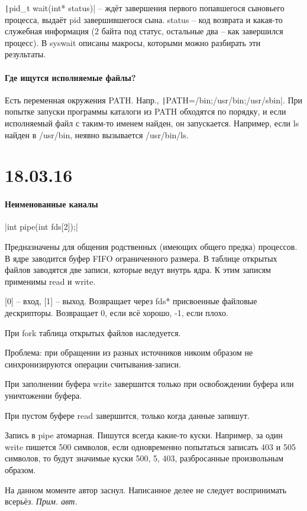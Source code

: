 \documentclass[a4paper,10pt]{article}
\newcommand{\cl}{\mint{c}}
\newcommand{\bash}{\texttt}
\begin{document}
\texttt|pid_t wait(int* status)| -- ждёт завершения первого попавшегося сыновьего процесса, выдаёт pid завершившегося сына. status -- код возврата и какая-то служебная информация (2 байта под статус, остальные два -- как завершился процесс). В syswait описаны макросы, которыми можно разбирать эти результаты.

\paragraph{Где ищутся исполняемые файлы?}
Есть переменная окружения PATH. Напр., \bash|PATH=/bin;/usr/bin;/usr/sbin|. При попытке запуски программы каталоги из PATH обходятся по порядку, и если исполняемый файл с таким-то именем найден, он запускается. Например, если ls найден в /usr/bin, неявно вызывается /usr/bin/ls.

\section{18.03.16}
\paragraph{Неименованные каналы}
\cl|int pipe(int fds[2]);|

Предназначены для общения родственных (имеющих общего предка) процессов.
В ядре заводится буфер FIFO ограниченного размера. В таблице открытых файлов заводятся две записи, которые ведут внутрь ядра. К этим записям применимы read и write.

[0] -- вход, [1] -- выход. Возвращает через fds* присвоенные файловые дескрипторы. Возвращает 0, если всё хорошо, -1, если плохо.

При fork таблица открытых файлов наследуется.

Проблема: при обращении из разных источников никоим образом не синхронизируются операции считывания-записи.

При заполнении буфера write завершится только при освобождении буфера или уничтожении буфера.

При пустом буфере read завершится, только когда данные запишут.

Запись в pipe атомарная. Пишутся всегда какие-то куски. Например, за один write пишется 500 символов, если одновременно попытаться записать 403 и 505 символов, то будут значимые куски 500, 5, 403, разбросанные произвольным образом.

На данном моменте автор заснул. Написанное делее не следует воспринимать всерьёз.
\textit{Прим. авт.}
\end{document}
